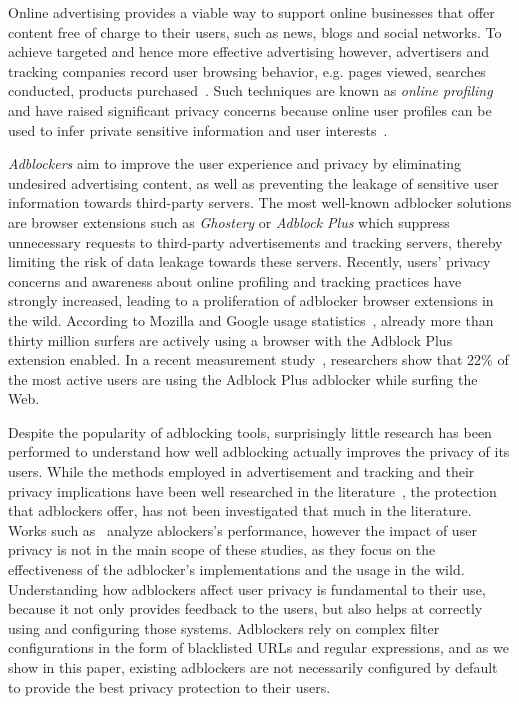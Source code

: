 \documentclass[compsoc, conference, letterpaper, 10pt, times]{IEEEtran}
\begin{document}
Online advertising provides a viable way to support online businesses that offer content free of charge to their users, such as news, blogs and social networks. To achieve targeted and hence more effective advertising however, advertisers and tracking companies record user browsing behavior, e.g. pages viewed, searches conducted, products purchased~\cite{mayer,barford, krishnamurthy_privacy_diffusion, soltani, Gill13}. Such techniques are known as \textit{online profiling} and have raised significant privacy concerns because online user profiles can be used to infer private sensitive information and user interests~\cite{castelluccia, mikians, datta, libert2015exposing}.

\emph{Adblockers} aim to improve the user experience and privacy by eliminating undesired advertising content, as well as preventing the leakage of sensitive user information towards third-party servers. The most well-known adblocker solutions are browser extensions such as \emph{Ghostery} or \emph{Adblock Plus} which suppress unnecessary requests to third-party advertisements and tracking servers, thereby limiting the risk of data leakage towards these servers. Recently, users' privacy concerns and awareness about online profiling and tracking practices have strongly increased, leading to a proliferation of adblocker browser extensions in the wild. According to Mozilla and Google usage statistics~\cite{Mozilla_statistics,Google_statistics}, already more than thirty million surfers are actively using a browser with the Adblock Plus extension enabled. In a recent measurement  study~\cite{pujol}, researchers show that 22\% of the most active users are using the Adblock Plus adblocker while surfing the Web.

Despite the popularity of adblocking tools, surprisingly little research has been performed to  understand how well adblocking actually improves the privacy of its users. While the methods employed in advertisement and tracking and their privacy implications have been well researched in the literature~\cite{krishnamurthy_measuring_privacy_loss, leon, englehardt,nikiforakis}, the protection that adblockers offer, has not been investigated that much in the literature. Works such as~\cite{pujol, butkiewicz, ruffel2015, kontaxis} analyze ablockers's performance, however the impact of user privacy is not in the main scope of these studies, as they focus on the effectiveness of the adblocker's implementations and the usage in the wild.
Understanding how adblockers affect user privacy is fundamental to their use, because it not only provides feedback to the users, but also helps at correctly using and configuring those systems. Adblockers rely on complex filter configurations in the form of blacklisted URLs and regular expressions, and as we show in this paper, existing adblockers are not necessarily configured by default to provide the best privacy protection to their users.
\end{document}
